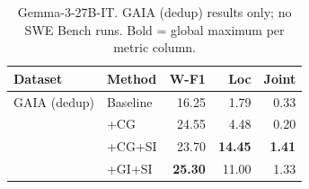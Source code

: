 \begin{table}[h]
\centering\small
\begin{tabular}{ll rrr}
\toprule
\textbf{Dataset} & \textbf{Method} & \textbf{W-F1} & \textbf{Loc} & \textbf{Joint} \\
\midrule
GAIA (dedup)  & Baseline  & 16.25 &  1.79 &  0.33 \\
              & +CG       & 24.55 &  4.48 &  0.20 \\
              & +CG+SI    & 23.70 & \textbf{14.45} & \textbf{1.41} \\
              & +GI+SI    & \textbf{25.30} & 11.00 &  1.33 \\
\bottomrule
\end{tabular}
\caption{Gemma-3-27B-IT. GAIA (dedup) results only; no SWE Bench runs.
  Bold = global maximum per metric column.}
\end{table}
